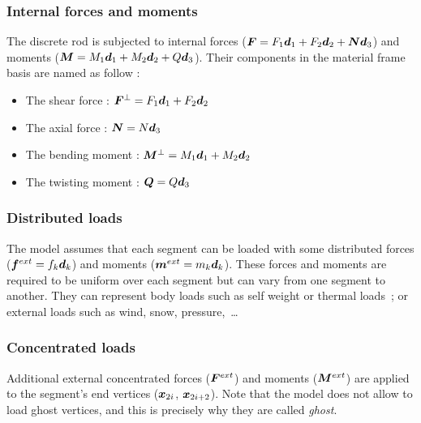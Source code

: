  \subsubsection{Internal forces and moments}
The discrete rod is subjected to internal forces ($\boldsymbol{F} = F_1 \boldsymbol{d}_1 + F_2 \boldsymbol{d}_2 + \boldsymbol{N}\boldsymbol{d}_3$) and moments ($\boldsymbol{M} = M_1 \boldsymbol{d}_1 + M_2 \boldsymbol{d}_2 + Q\boldsymbol{d}_3$). Their components in the material frame basis are named as follow :
\begin{itemize}
\item The shear force : $\boldsymbol{F}^{\perp} = F_1 \boldsymbol{d}_1 + F_2 \boldsymbol{d}_2$
\item The axial force : $\boldsymbol{N} = N \boldsymbol{d}_3$
\item The bending moment : $\boldsymbol{M}^{\perp} = M_1 \boldsymbol{d}_1 + M_2 \boldsymbol{d}_2$
\item The twisting moment : $\boldsymbol{Q} = Q \boldsymbol{d}_3$
\end{itemize}

\subsubsection{Distributed loads}
The model assumes that each segment can be loaded with some distributed forces ($\boldsymbol{f}^{ext} = f_k\boldsymbol{d}_k$) and moments ($\boldsymbol{m}^{ext} = m_k\boldsymbol{d}_k$). These forces and moments are required to be uniform over each segment but can vary from one segment to another. They can represent body loads such as self weight or thermal loads~; or external loads such as wind, snow, pressure,~\dots

\subsubsection{Concentrated loads}
Additional external concentrated forces ($\boldsymbol{F}^{ext}$) and moments ($\boldsymbol{M}^{ext}$) are applied to the segment's end vertices ($\boldsymbol{x}_{2i}$,  $\boldsymbol{x}_{2i+2}$). Note that the model does not allow to load ghost vertices, and this is precisely why they are called \emph{ghost}.

